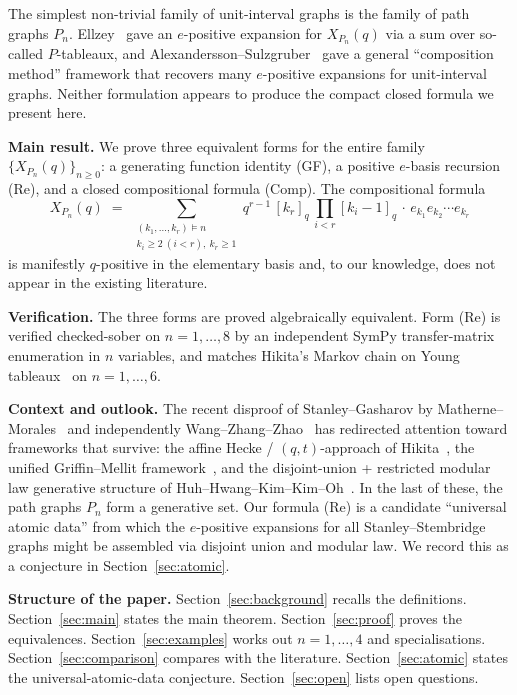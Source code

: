 \documentclass[11pt,a4paper]{amsart}
\theoremstyle{definition}
\newcommand{\CQF}{X}
\newcommand{\Path}{P}
\newcommand{\qint}[1]{[#1]_q}
\newcommand{\vDashn}{\vDash}
\begin{document}
The simplest non-trivial family of unit-interval graphs is the family
of path graphs $\Path_n$. Ellzey~\cite{Ellzey2017a,Ellzey2017b} gave
an $e$-positive expansion for $\CQF_{\Path_n}(q)$ via a sum over
so-called $P$-tableaux, and Alexandersson--Sulzgruber~\cite{AlexanderssonSulzgruber2025}
gave a general ``composition method'' framework that recovers many
$e$-positive expansions for unit-interval graphs. Neither formulation
appears to produce the compact closed formula we present here.

\smallskip
\textbf{Main result.} We prove three equivalent forms for the entire
family $\{\CQF_{\Path_n}(q)\}_{n \ge 0}$: a generating function identity
(GF), a positive $e$-basis recursion (Re), and a closed compositional
formula (Comp). The compositional formula
\[
  \CQF_{\Path_n}(q)
  \;=\; \sum_{\substack{(k_1,\ldots,k_r) \vDashn n \\ k_i \ge 2\ (i<r),\ k_r \ge 1}}
        q^{r-1}\, \qint{k_r}\, \prod_{i<r} \qint{k_i - 1}\, \cdot\, e_{k_1} e_{k_2} \cdots e_{k_r}
\]
is manifestly $q$-positive in the elementary basis and, to our
knowledge, does not appear in the existing literature.

\smallskip
\textbf{Verification.} The three forms are proved algebraically
equivalent. Form (Re) is verified checked-sober on $n = 1, \ldots, 8$
by an independent SymPy transfer-matrix enumeration in $n$ variables,
and matches Hikita's Markov chain on Young tableaux~\cite{Hikita2025}
on $n = 1, \ldots, 6$.

\smallskip
\textbf{Context and outlook.} The recent disproof of Stanley--Gasharov
by Matherne--Morales~\cite{MatherneMorales2026} and independently
Wang--Zhang--Zhao~\cite{WangZhangZhao2026} has redirected attention
toward frameworks that survive: the affine Hecke / $(q,t)$-approach
of Hikita~\cite{Hikita2025}, the unified Griffin--Mellit
framework~\cite{GriffinMellit2025}, and the disjoint-union + restricted
modular law generative structure of
Huh--Hwang--Kim--Kim--Oh~\cite{HuhHwangKimKimOh2025}. In the last of
these, the path graphs $\Path_n$ form a generative set. Our formula
(Re) is a candidate ``universal atomic data'' from which the
$e$-positive expansions for all Stanley--Stembridge graphs might be
assembled via disjoint union and modular law. We record this as a
conjecture in Section~\ref{sec:atomic}.

\smallskip
\textbf{Structure of the paper.}
Section~\ref{sec:background} recalls the definitions.
Section~\ref{sec:main} states the main theorem.
Section~\ref{sec:proof} proves the equivalences.
Section~\ref{sec:examples} works out $n = 1, \ldots, 4$ and specialisations.
Section~\ref{sec:comparison} compares with the literature.
Section~\ref{sec:atomic} states the universal-atomic-data conjecture.
Section~\ref{sec:open} lists open questions.
\end{document}
